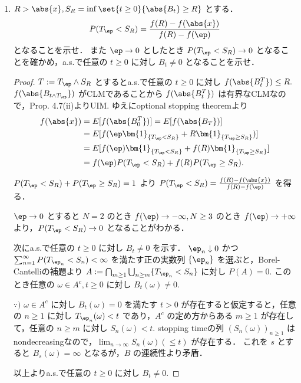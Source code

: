 \documentclass{jsarticle}
\begin{document}
\begin{enumerate}
    \item
    $R>\abs{x},S_R=\inf\set{t\ge0}{\abs{B_t}\ge R}$ とする．
    $$
    P(T_\ep<S_R)=\frac{f(R)-f(\abs{x})}{f(R)-f(\ep)}
    $$
    となることを示せ．
    また $\ep\to0$ としたとき $P(T_\ep<S_R)\to0$ となることを確かめ，a.s.で任意の $t\ge0$ に対し $B_t\neq0$ となることを示せ．
    \begin{proof}
        $T:=T_\ep\wedge S_R$ とするとa.s.で任意の $t\ge0$ に対し $f(\abs{B_t^T})\le R.$
        $f(\abs{B_{t\wedge T_\ep}})$ がCLMであることから $f(\abs{B_t^T})$ は有界なCLMなので，Prop. 4.7(ii)よりUIM.
        ゆえにoptional stopping theoremより
        \begin{align}
            f(\abs{x})
            &= E[f(\abs{B_0^T})]
            = E[f(\abs{B_T})] \\
            &= E[f(\ep\bm{1}_{\{T_\ep<S_R\}}+R\bm{1}_{\{T_\ep\ge S_R\}})] \\
            &= E[f(\ep)\bm{1}_{\{T_\ep<S_R\}}+f(R)\bm{1}_{\{T_\ep\ge S_R\}}] \\
            &= f(\ep)P(T_\ep<S_R)+f(R)P(T_\ep\ge S_R).
        \end{align}

        $P(T_\ep<S_R)+P(T_\ep\ge S_R)=1$ より $P(T_\ep<S_R)=\frac{f(R)-f(\abs{x})}{f(R)-f(\ep)}$ を得る．

        $\ep\to0$ とすると $N=2$ のとき $f(\ep)\to -\infty, N\ge3$ のとき $f(\ep)\to +\infty$ より，$P(T_\ep<S_R)\to0$ となることがわかる．

        次にa.s.で任意の $t\ge0$ に対し $B_t\neq0$ を示す．
        $\ep_n\downarrow0$ かつ $\sum_{n=1}^{\infty}P(T_{\ep_n}<S_n)<\infty$ を満たす正の実数列 $\{\ep_n\}$ を選ぶと，Borel-Cantelliの補題より $A:=\bigcap_{m\ge1}\bigcup_{n\ge m}\{T_{\ep_n}<S_n\}$ に対し $P(A)=0.$
        このとき任意の $\omega\in A^c, t\ge0$ に対し $B_t(\omega)\neq0.$

        \begin{screen}
            $\because)$
            $\omega\in A^c$ に対し $B_t(\omega)=0$ を満たす $t>0$ が存在すると仮定すると，任意の $n\ge1$ に対し $T_{\ep_n}(\omega)<t$ であり，$A^c$ の定め方からある $m\ge1$ が存在して，任意の $n\ge m$ に対し $S_n(\omega)<t.$
            stopping timeの列 $(S_n(\omega))_{n\ge1}$ はnondecreasingなので，$\lim_{n\to\infty}S_n(\omega)(\le t)$ が存在する．
            これを $s$ とすると $B_s(\omega)=\infty$ となるが，$B$ の連続性より矛盾．
        \end{screen}

        以上よりa.s.で任意の $t\ge0$ に対し $B_t\neq0.$
    \end{proof}
    

\end{enumerate}
\end{document}
